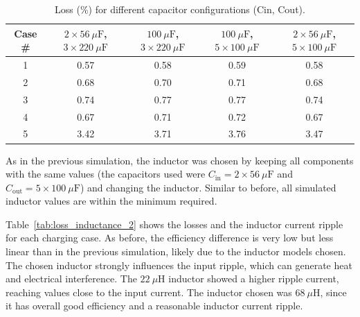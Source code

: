         
        \begin{table}[!ht]
            \caption{Loss (\%) for different capacitor configurations (Cin, Cout).}
            \centering
            \begin{tabular}{|c|cccc|}
            \hline
            \textbf{Case \#} & \textbf{$2\times56~\mu\mathrm{F}$, $3\times220~\mu\mathrm{F}$} & \textbf{$100~\mu\mathrm{F}$, $3\times220~\mu\mathrm{F}$} & \textbf{$100~\mu\mathrm{F}$, $5\times100~\mu\mathrm{F}$} & \textbf{$2\times56~\mu\mathrm{F}$, $5\times100~\mu\mathrm{F}$} \\
            \hline
            1 & 0.57 & 0.58 & 0.59 & 0.58 \\
            2 & 0.68 & 0.70 & 0.71 & 0.68 \\
            3 & 0.74 & 0.77 & 0.77 & 0.74 \\
            4 & 0.67 & 0.71 & 0.72 & 0.67 \\
            5 & 3.42 & 3.71 & 3.76 & 3.47 \\
            \hline
            \end{tabular}
            
            \label{tab:loss_capacitors_2}
        \end{table}

        As in the previous simulation, the inductor was chosen by keeping all components with the same values (the capacitors used were $C_\mathrm{in} = 2\times56~\mu\mathrm{F}$ and $C_\mathrm{out} = 5\times100~\mu\mathrm{F}$) and changing the inductor. Similar to before, all simulated inductor values are within the minimum required.

        Table~\ref{tab:loss_inductance_2} shows the losses and the inductor current ripple for each charging case. As before, the efficiency difference is very low but less linear than in the previous simulation, likely due to the inductor models chosen. The chosen inductor strongly influences the input ripple, which can generate heat and electrical interference. The $22~\mu\mathrm{H}$ inductor showed a higher ripple current, reaching values close to the input current. The inductor chosen was $68~\mu\mathrm{H}$, since it has overall good efficiency and a reasonable inductor current ripple.

